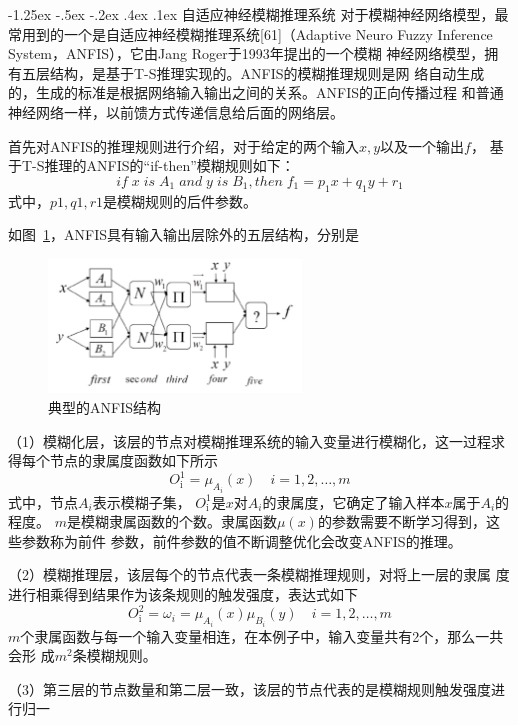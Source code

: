 \documentclass[12pt, a4paper]{article}
\makeatletter
\newcommand*{\hei}{\CJKfamily{zhhei}}
\newcommand{\xiaosihao}{\fontsize{12pt}{\baselineskip}\selectfont}
\renewcommand\subsection{\@startsection{subsection}{1}{\z@}%
{-1.25ex \@plus -.5ex \@minus -.2ex}%
{.4ex \@plus .1ex}%
{\normalfont\xiaosihao\bf\hei}}
\makeatother
\begin{document}
\subsection{自适应神经模糊推理系统}
对于模糊神经网络模型，最常用到的一个是自适应神经模糊推理系统[61]（Adaptive
Neuro Fuzzy Inference System，ANFIS），它由Jang Roger于1993年提出的一个模糊
神经网络模型，拥有五层结构，是基于T-S推理实现的。ANFIS的模糊推理规则是网
络自动生成的，生成的标准是根据网络输入输出之间的关系。ANFIS的正向传播过程
和普通神经网络一样，以前馈方式传递信息给后面的网络层。
\par
首先对ANFIS的推理规则进行介绍，对于给定的两个输入$x,y$以及一个输出$f$，
基于T-S推理的ANFIS的“if-then”模糊规则如下：
$$if \; x \; is \; A_1 \; and \; y \; is \; B_1, then \; f_1=p_1x+q_1y+r_1$$
式中，$p1, q1, r1$是模糊规则的后件参数。
\par
如图~\ref{fig:2}，ANFIS具有输入输出层除外的五层结构，分别是
\par
\begin{figure}[htbp] %
	\centering
	\includegraphics[width=0.6\textwidth]{典型的ANFIS结构.png} %
	\caption{典型的ANFIS结构}
	\label{fig:2}
\end{figure}
\par
（1）模糊化层，该层的节点对模糊推理系统的输入变量进行模糊化，这一过程求得每个节点的隶属度函数如下所示
\[O_{\text{i}}^{\text{1}} = \mu_{A_i}(x) \quad i=1,2,\ldots,m \]
式中，节点$A_i$表示模糊子集， $O_{\text{i}}^{\text{1}}$是$x$对$A_i$的隶属度，它确定了输入样本$x$属于$A_i$的程度。
$m$是模糊隶属函数的个数。隶属函数$\mu(x)$的参数需要不断学习得到，这些参数称为前件
参数，前件参数的值不断调整优化会改变ANFIS的推理。
\par
（2）模糊推理层，该层每个的节点代表一条模糊推理规则，对将上一层的隶属
度进行相乘得到结果作为该条规则的触发强度，表达式如下
\[O_{\text{i}}^{\text{2}} = \omega_i = \mu_{A_i}(x)\mu_{B_i}(y) \quad i=1,2,\ldots,m \]
$m$个隶属函数与每一个输入变量相连，在本例子中，输入变量共有2个，那么一共会形
成$m^2$条模糊规则。
\par
（3）第三层的节点数量和第二层一致，该层的节点代表的是模糊规则触发强度进行归一
\end{document}
